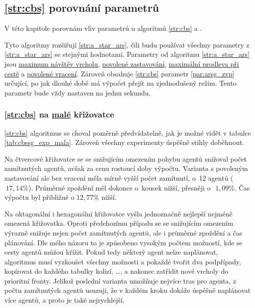 \subsection{\ref{str:cbs} porovnání parametrů}\label{subsec:cbs_porovnani_parametru}

V této kapitole porovnám vliv parametrů u algoritmů \ref{str:cbs} a .

Tyto algoritmy rozšiřují \ref{str:a_star_ars},
čili budu používat všechny parametry z \ref{str:a_star_ars} se stejnými hodnotami.
Parametry od algoritmu \ref{str:a_star_ars} jsou \hyperref[par:ars_mnv]{maximum návštěv vrcholu},
\hyperref[par:ars_pz]{povolené zastavování}, \hyperref[par:ars_mpc]{maximální prodleva při cestě} a
\hyperref[par:ars_pv]{povolené vracení}.
Zároveň obsahuje \ref{str:cbs} parametr \ref{par:arsg_zvp} určující,
po jak dlouhé době má výpočet přejít na zjednodušený režim.
Tento parametr bude vždy nastaven na jednu sekundu.

\subsubsection{\ref{str:cbs} na \hyperref[par:data_mala]{malé} křižovatce}
\label{subsubsec:exp_cbssg_mala_krizovatka}

\ref{str:cbs} algoritmus se choval poměrně předvídatelně, jak je možné vidět v tabulce \ref{tab:cbssg_exp_mala}.
Zároveň všechny experimenty úspěšně stihly doběhnout.


Na čtvercové křižovatce se se snižujícím omezením pohybu agentů snižoval počet zamítnutých agentů,
avšak za cenu rostoucí doby výpočtu.
Varianta s povoleným zastavování ale bez vracení měla mírně vyšší počet zamítnutí, o~12 agentů ($~17,14\%$).
Průměrné zpoždění měl dokonce o~kousek nižší, přesněji o~$~1,09\%$.
Čas výpočtu byl přibližně o $12,77\%$ nižší.

Na oktagonální i hexagonální křižovatce vyšla jednoznačně nejlepší nejméně omezená křižovatka.
Oproti předchozímu případu se se snižujícím omezením výrazně snižuje nejen počet zamítnutých agentů,
ale i průměrné zpoždění a čas plánování.
Dle mého názoru to je způsobeno vysokým počtem možností, kde se cesty agentů můžou křížit.
Pokud tedy některý agent nelze naplánovat, algoritmus musí vyzkoušet všechny možnosti
a pokaždé tvořit dva podpřípady, kopírovat do každého tabulky kolizí, \dots,
a nakonec zatřídit nové vrcholy do prioritní fronty.
Jelikož poslední varianta umožňuje nejvíce tras pro agenta, z počtu zamítnutých agentů usuzuji,
že v každém kroku dokáže úspěšně naplánovat více agentů, a proto je také nejrychlejší.

